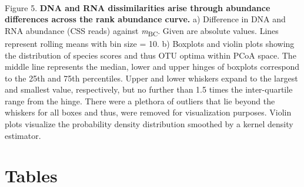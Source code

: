 \documentclass[12pt,a4paper]{article} %
\begin{document}
\\
Figure 5. \textbf{DNA and RNA dissimilarities arise through abundance differences across the rank abundance curve.} a) Difference in DNA and RNA abundance (CSS reads) against \textit{m}\textsubscript{BC}. Given are absolute values. Lines represent rolling means with bin size = 10. b) Boxplots and violin plots showing the distribution of species scores and thus OTU optima within PCoA space. The middle line represents the median, lower and upper hinges of boxplots correspond to the 25th and 75th percentiles. Upper and lower whiskers expand to the largest and smallest value, respectively, but no further than 1.5 times the inter-quartile range from the hinge. There were a plethora of outliers that lie beyond the whiskers for all boxes and thus, were removed for visualization purposes. Violin plots visualize the probability density distribution smoothed by a kernel density estimator.\\

\newpage

\section*{Tables}
\end{document}
